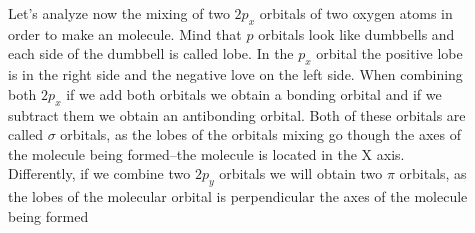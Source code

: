 \documentclass[main.tex]{subfiles}
\newcommand\chapterlabel{geometry}
\begin{document}
\begin{description}
\item[] Let's analyze now the mixing of two $2p_x$ orbitals of two oxygen atoms in order to make an  molecule. Mind that $p$ orbitals look like dumbbells and each side of the dumbbell is called lobe. In the $p_x$ orbital the positive lobe is in the right side and the negative love on the left side. When combining both $2p_x$ if we add both orbitals we obtain a bonding orbital and if we subtract them we obtain an antibonding orbital. Both of these orbitals are called $\sigma$ orbitals, as the lobes of the orbitals mixing go though the axes of the molecule being formed--the molecule is located in the X axis. Differently, if we combine two $2p_y$ orbitals we will obtain two $\pi$ orbitals, as the lobes of the molecular orbital is perpendicular the axes of the molecule being formed
\vspace{-1cm}
      \label{Fig:{\chapterlabel}\thefigurenewcounter}
     \begin{center}
\end{center}
\end{description}
\end{document}
